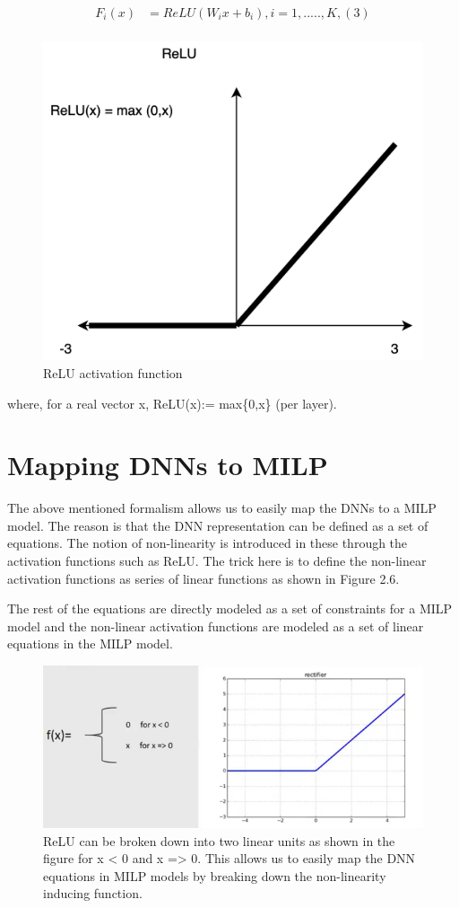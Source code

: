 \begin{align*}
F_i(x) &= ReLU(W_ix + b_i) ,  i = 1,.....,K , (3) \\
\end{align*}


\begin{figure}
	\centering
	\includegraphics[width=0.7\linewidth]{Images/ReLU}
	\caption[Activation functions]{ReLU activation function}
	\label{fig:ReLU}
\end{figure}
where, for a real vector x, ReLU(x):= max\{0,x\} (per layer).


\section{Mapping DNNs to MILP}
The above mentioned formalism allows us to easily map the DNNs to a MILP model. The reason is that the DNN representation can be defined as a set of equations. The notion of non-linearity is introduced in these through the activation functions such as ReLU. The trick here is to define the non-linear activation functions as series of linear functions as shown in Figure 2.6. 

The rest of the equations are directly modeled as a set of constraints for a MILP model and the non-linear activation functions are modeled as a set of linear equations in the MILP model. 

\begin{figure}
	\centering
	\includegraphics[width=0.7\linewidth]{Images/ReLUbreakdown}
	\caption{ReLU can be broken down into two linear units as shown in the figure for x < 0 and x => 0. This allows us to easily map the DNN equations in MILP models by breaking down the non-linearity inducing function.}
	\label{fig:relubreakdown}
\end{figure}



